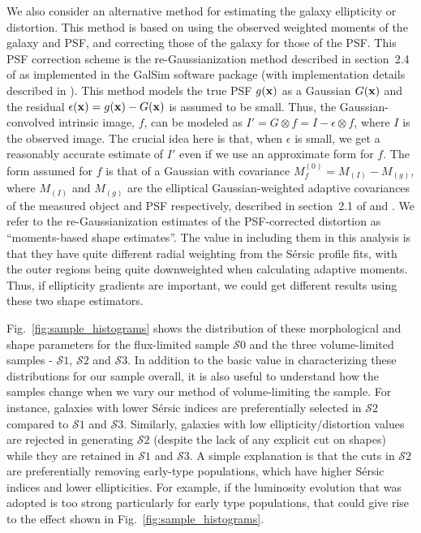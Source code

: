 \documentclass[twocolumn,useAMS,usenatbib]{mn2e}
\newcommand{\sersic}{S\'{e}rsic }
\newcommand{\s}{\ensuremath{\mathcal{S}}}
\begin{document}
We also consider an alternative method for estimating the galaxy
ellipticity or distortion.  This method is based on using the observed weighted
moments of the galaxy and PSF, and correcting those of the galaxy for
those of the PSF.  This PSF correction scheme is the
re-Gaussianization method described in section~2.4 of \cite{HS03} 
as implemented in the {\sc GalSim} software package
(with implementation details described in \citealt{2014arXiv1407.7676R}).
This method models the true PSF $g({\bf x})$ as a Gaussian $G({\bf x})$ and the residual $\epsilon({\bf x}) = g({\bf x}) - G({\bf x})$ is assumed to be small. Thus, the Gaussian-convolved
intrinsic image, $f$, can be modeled as $I' = G\otimes f = I - \epsilon \otimes f$, where $I$ is the observed image. The crucial idea here is that, when $\epsilon$ is small, we get a reasonably accurate
estimate of $I'$ even if we use an approximate form for $f$. The form
assumed for $f$ is that of a Gaussian with covariance $M_f^{(0)} = M_{(I)}
- M_{(g)}$, where $M_{(I)}$ and $M_{(g)}$ are the elliptical Gaussian-weighted adaptive
covariances of the measured object and PSF respectively, described in
section~2.1 of \cite{HS03} and \cite{BJ02}. We refer to the
re-Gaussianization estimates of the PSF-corrected distortion as
``moments-based shape estimates''.  The value in including them in
this analysis is that they have quite different radial weighting from
the \sersic profile fits, with the outer regions being quite
downweighted when calculating adaptive moments.  Thus, if ellipticity
gradients are important, we could get different results using these
two shape estimators.

Fig.~\ref{fig:sample_histograms} shows the distribution of these morphological and shape parameters for the flux-limited sample \s$0$ and the three
volume-limited samples - \s$1$, \s$2$ and \s$3$. In addition to the
basic value in characterizing these distributions for our sample
overall, it is also useful to understand how the samples change when
we vary our method of volume-limiting the sample.
For instance, galaxies with lower \sersic indices are preferentially
selected in \s$2$ compared to \s$1$ and \s$3$. Similarly, galaxies
with low ellipticity/distortion values 
are rejected in generating \s$2$ (despite the lack of any explicit
cut on shapes) while they are retained in
\s$1$ and \s$3$.  A simple explanation is that the cuts in \s$2$ are
preferentially removing early-type populations, which have higher
\sersic indices and lower ellipticities.  For example, if the
luminosity evolution that was adopted is too strong particularly for
early type populations, that could give rise to the effect shown in
Fig.~\ref{fig:sample_histograms}.
\end{document}
